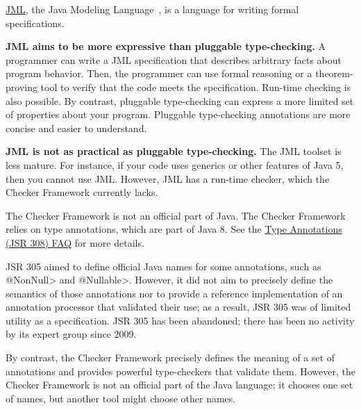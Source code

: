 
\href{http://www.eecs.ucf.edu/~leavens/JML/index.shtml}{JML}, the Java Modeling
Language~\cite{LeavensBR2006:JML}, is a language for writing formal
specifications.

\textbf{JML aims to be more expressive than pluggable type-checking.}
A programmer can write a JML specification that
describes arbitrary facts about program behavior.  Then, the programmer can
use formal reasoning or a theorem-proving tool to verify that the code
meets the specification.  Run-time checking is also possible.
By contrast, pluggable type-checking can express a more limited set of
properties about your program.  Pluggable type-checking annotations are
more concise and easier to understand.

\textbf{JML is not as practical as pluggable type-checking.}
The JML toolset is less mature.  For instance, if your code uses
generics or other features of Java 5, then you cannot use JML.
However, JML has a run-time checker, which the Checker Framework currently
lacks.



The Checker Framework is not an official part of Java.
The Checker Framework relies on
type annotations, which are part of Java 8.  See the
\href{https://checkerframework.org/jsr308/jsr308-faq.html#pluggable-type-checking-in-java}{Type
  Annotations (JSR 308) FAQ} for more details.



JSR 305 aimed to define official Java names for some annotations, such as
\<@NonNull> and \<@Nullable>.  However, it did not aim to precisely define
the semantics of those annotations nor to provide a reference
implementation of an annotation processor that validated their use;
as a result, JSR 305 was of limited utility as a specification.
JSR 305 has been abandoned; there has been
no activity by its expert group since
2009.

By contrast, the Checker Framework precisely defines the meaning of a set
of annotations and provides powerful type-checkers that validate them.
However, the Checker Framework is not an official part of the Java
language; it chooses one set of names, but another tool might choose other
names.

